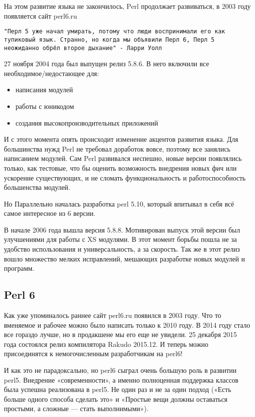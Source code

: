 На этом развитие языка не закончилось, Perl продолжает развиваться, в 2003 году появляется сайт perl6.ru

\verb|"Перл 5 уже начал умирать, потому что люди воспринимали его как тупиковый язык. Странно, но когда мы объявили Перл 6, Перл 5 неожиданно обрёл второе дыхание" - Ларри Уолл|

27 ноября 2004 года был выпущен релиз 5.8.6. В него включили все необходимое/недостающее для:
\begin{itemize}
 \item написания модулей
 \item работы с юникодом
 \item создания высокопроизводительных приложений
\end{itemize}

И с этого момента опять происходит изменение акцентов развития языка. Для большинства нужд Perl не требовал доработок вовсе, поэтому все занялись написанием модулей. Сам Perl развивался неспешно, новые версии появлялись только, как тестовые, что бы оценить возможность внедрения новых фич или ускорение существующих, и не сломать функциональность и работоспособность большенства модулей.

Но Параллельно началась разработка perl 5.10, который впитывал в себя всё самое интересное из 6 версии.

В начале 2006 года вышла версия 5.8.8. Мотивирован выпуск этой версии был улучшениями для работы с XS модулями. В этот момент борьбы пошла не за удобство использования и универсальность, а за скорость. Так же в этот релиз вошло множество мелких исправлений, мешающих разработке новых модулей и программ.

\subsection{Perl 6}

Как уже упоминалось раннее сайт perl6.ru появился в 2003 году. Что то вменяемое и рабочее можно было написать только к 2010 году. В 2014 году стало все гораздо лучше, но в продакшене мы его еще не увидели. 25 декабря 2015 года состоялся релиз компилятора Rakudo 2015.12. И теперь можно присоединятся к немогочисленным разработчикам на perl6!

И как это не парадоксально, но perl6 сыграл очень большую роль в развитии perl5. Внедрение «современности», а именно полноценная поддержка классов была успешна реализована в perl5. Не один раз и не за один подход («Есть больше одного способа сделать это» и «Простые вещи должны оставаться простыми, а сложные — стать выполнимыми»).

